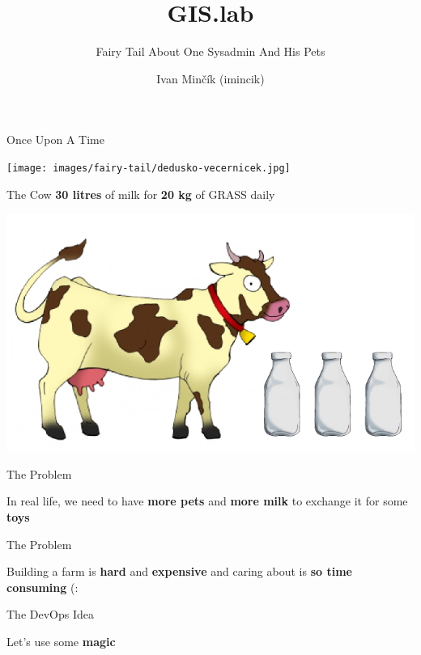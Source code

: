\documentclass[12pt]{beamer}
\title{GIS.lab}
\subtitle{Fairy Tail About One Sysadmin And His Pets}
\author{Ivan Minčík (imincik)}
\date{}
\begin{document}
\begin{frame}
	\titlepage
\end{frame}

\begin{frame}[plain]{Once Upon A Time}
	\begin{center}
		\texttt{[image: images/fairy-tail/dedusko-vecernicek.jpg]}
	\end{center}
\end{frame}

\begin{frame}{The Cow}
	\textbf{30 litres} of milk for \textbf{20 kg} of GRASS daily
	\begin{center}
		\includegraphics[keepaspectratio=true,height=0.6\textheight]{images/cow.png}
	\end{center}
\end{frame}

\begin{frame}{The Problem}
	\begin{center}
		In real life, we need to have \textbf{more pets} and \textbf{more milk} to exchange it for some \textbf{toys} 
	\end{center}
\end{frame}

\begin{frame}{The Problem}
	\begin{center}
		Building a farm is \textbf{hard} and \textbf{expensive} and caring about is \textbf{so time consuming} (:
		\end{center}
\end{frame}

\begin{frame}{The DevOps Idea}
	\begin{center}
		Let's use some \textbf{magic}
	\end{center}
\end{frame}
\end{document}
